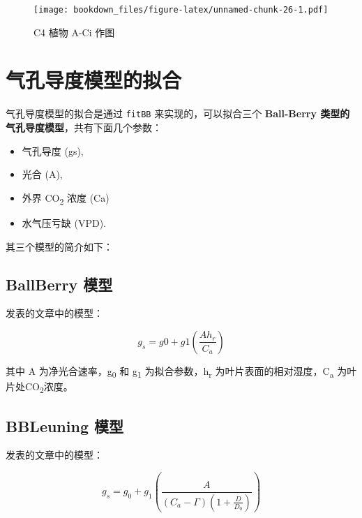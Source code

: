 \documentclass[
]{krantz}
\providecommand{\tightlist}{%
  \setlength{\itemsep}{0pt}\setlength{\parskip}{0pt}}
\begin{document}
\begin{figure}
\centering
\texttt{[image: bookdown\_files/figure-latex/unnamed-chunk-26-1.pdf]}
\caption{\label{fig:unnamed-chunk-26}C4 植物 A-Ci 作图}
\end{figure}

\cleardoublepage

\hypertarget{stomotal_sim}{%
\chapter{气孔导度模型的拟合}\label{stomotal_sim}}

气孔导度模型的拟合是通过 \texttt{fitBB} 来实现的，可以拟合三个 \textbf{Ball-Berry 类型的气孔导度模型}，共有下面几个参数：

\begin{itemize}
\tightlist
\item
  气孔导度 (gs),
\item
  光合 (A),
\item
  外界 CO\textsubscript{2} 浓度 (Ca)
\item
  水气压亏缺 (VPD).
\end{itemize}

其三个模型的简介如下：

\hypertarget{ballberry}{%
\section{BallBerry 模型}\label{ballberry}}

\citet{Ball1987A} 发表的文章中的模型：

\begin{equation}
g_s = g0 + g1(\frac{A h_r}{C_a})
\label{eq:ballberry}
\end{equation}

其中 A 为净光合速率，g\textsubscript{0} 和 g\textsubscript{1} 为拟合参数，h\textsubscript{r} 为叶片表面的相对湿度，C\textsubscript{a} 为叶片处CO\textsubscript{2}浓度。

\hypertarget{bbleuning}{%
\section{BBLeuning 模型}\label{bbleuning}}

\citet{leuning1995a} 发表的文章中的模型：

\begin{equation}
g_s = g_0 + g_1(\frac{A}{(C_a - \Gamma)(1 + \frac{D}{D_0})})
\label{eq:BBLeuning}
\end{equation}
\end{document}
